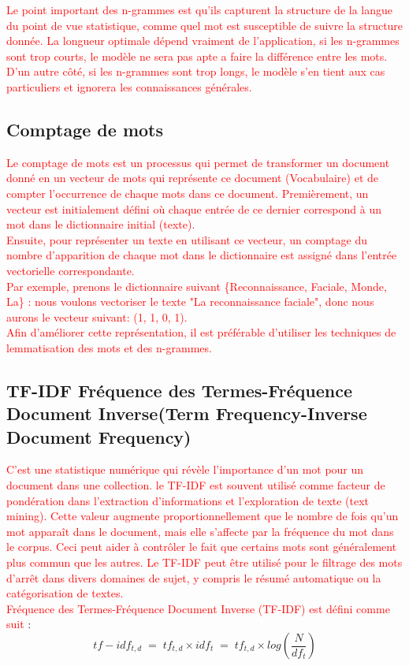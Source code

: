      \textcolor{red}{Le point important des n-grammes est qu'ils capturent la structure de la langue du point de vue statistique, comme quel mot est susceptible de suivre la structure donnée. La longueur optimale dépend vraiment de l'application, si les n-grammes sont trop courts, le modèle ne sera pas apte a faire la différence entre les mots. D'un autre côté, si les n-grammes sont trop longs, le modèle s'en tient aux cas particuliers et ignorera les connaissances générales.}
    
    \subsection{Comptage de mots}
    
     \textcolor{red}{Le comptage de mots est un processus qui permet de transformer un document donné en un vecteur de mots qui représente ce document (Vocabulaire) et de compter l'occurrence de chaque mots dans ce document. Premièrement, un vecteur est initialement défini où chaque entrée de ce dernier correspond à un mot dans le dictionnaire initial (texte).\\ 
    Ensuite, pour représenter un texte en utilisant ce vecteur, un comptage du nombre d'apparition de chaque mot dans le dictionnaire est assigné dans l'entrée vectorielle correspondante.\\ 
    Par exemple, prenons le dictionnaire suivant \{Reconnaissance, Faciale, Monde, La\} :
    nous voulons vectoriser le texte "La reconnaissance faciale", donc nous aurons le vecteur suivant: (1, 1, 0, 1).\\
    Afin d'améliorer cette représentation, il est préférable d'utiliser les techniques de lemmatisation des mots et des n-grammes.}
    
    \subsection{TF-IDF Fréquence des Termes-Fréquence Document Inverse(Term Frequency-Inverse Document Frequency)}
    
     \textcolor{red}{C'est une statistique numérique qui révèle l'importance d'un mot pour un document dans une collection. le TF-IDF est souvent utilisé comme facteur de pondération dans l'extraction d'informations et l'exploration de texte (text mining).
    Cette valeur augmente proportionnellement que le nombre de fois qu'un mot apparaît dans le document, mais elle s'affecte par la fréquence du mot dans le corpus. Ceci peut aider à contrôler le fait que certains mots sont généralement plus commun que les autres. Le TF-IDF peut être utilisé pour le filtrage des mots d'arrêt dans divers domaines de sujet, y compris le résumé automatique ou la catégorisation de textes. \\
    Fréquence des Termes-Fréquence Document Inverse (TF-IDF) est défini comme suit} :
    $$
    tf-idf_{t,d} \; = \; tf_{t,d} \times idf_t \; = \; tf_{t,d}
    \times log(\frac{N}{df_t})
    $$
     
